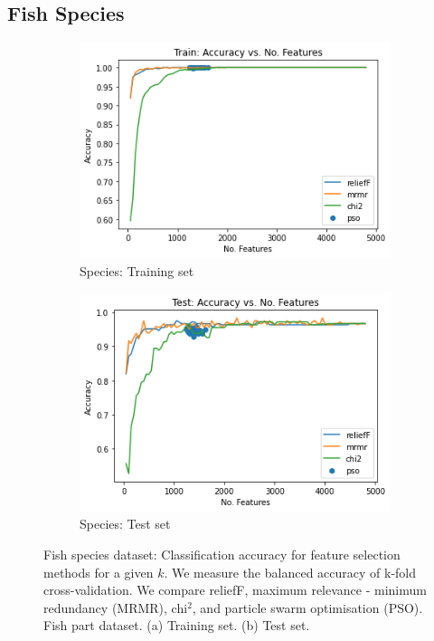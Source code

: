 \documentclass[runningheads]{llncs}
\begin{document}
\subsection{Fish Species}

\begin{figure}[htb]
  \centering
  \begin{subfigure}[b]{.45\linewidth}
    \includegraphics[width=\linewidth]{accuracy-features-fish-train.png}
    \caption{Species: Training set}\label{fig:accuracy-features-fish-train}
  \end{subfigure}
  \begin{subfigure}[b]{.45\linewidth}
    \includegraphics[width=\linewidth]{accuracy-features-fish-test.png}
    \caption{Species: Test set}\label{fig:accuracy-features-fish-test}
  \end{subfigure}
  \caption[Two numerical solutions]{
    Fish species dataset: Classification accuracy for feature selection methods for a given $k$.
    We measure the balanced accuracy of k-fold cross-validation.
    We compare reliefF, maximum relevance - minimum redundancy (MRMR), chi$^2$, and particle swarm optimisation (PSO).
    Fish part dataset. (a) Training set. (b) Test set.}
  \label{fig:animals}
\end{figure}
\end{document}
